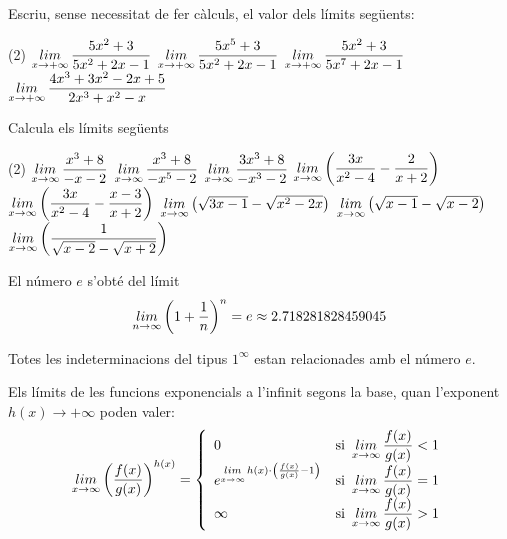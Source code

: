 \begin{mylist}
	\exer Escriu, sense necessitat de fer càlculs, el valor dels límits següents:

	\begin{tasks}(2) 
		\task  $\limx{+\infty} \dfrac{5x^2+3}{5x^2+2x-1}$
		\task  $\limx{+\infty} \dfrac{5x^5+3}{5x^2+2x-1}$
		\task  $\limx{+\infty} \dfrac{5x^2+3}{5x^7+2x-1}$
		\task  $\limx{+\infty} \dfrac{4x^3+3x^2-2x+5}{2x^3+x^2-x}$	
	\end{tasks}

	\answers{[$1$, $+\infty$, $0$, $2$]}
	
	\exer[1] Calcula els límits següents
	
	\begin{tasks}(2) 
		\task $\limx{\infty } \dfrac{x^{3} +8}{-x-2} $ 
		\task $\limx{\infty } \dfrac{x^{3} +8}{-x^{5} -2} $   
		\task $\limx{\infty } \dfrac{3x^{3} +8}{-x^{3} -2} $   
		\task $\limx{\infty } \left(\dfrac{3x}{x^{2} -4} -\dfrac{2}{x+2} \right)$
	\task $\limx{\infty } \left(\dfrac{3x}{x^{2} -4} -\dfrac{x-3}{x+2} \right)$  
	 \task $\limx{\infty } \left(\sqrt{3x-1} -\sqrt{x^{2} -2x} \right)$  
	 \task $\limx{\infty } \left(\sqrt{x-1} -\sqrt{x-2} \right)$ 
	 \task $\limx{\infty } \left(\dfrac{1}{\sqrt{x-2} -\sqrt{x+2} } \right)$
	\end{tasks}

\end{mylist}
\pagebreak

\begin{warningbox}
	
	El número $e$ s'obté del límit
	\[ \limx[n]{\infty} \left( 1+ \frac{1}{n} \right)^n = e \approx 2.718281828459045 \]
	
	Totes les indeterminacions del tipus $1^\infty$ estan relacionades amb el número $e$.
	
\end{warningbox}

\begin{theorybox}
	Els límits de les funcions exponencials a l'infinit segons la base, quan l'exponent $h(x) \rightarrow +\infty$ poden valer: 
	\begin{equation*}
	\limx{\infty} \left(\dfrac{f(x)}{g(x)}\right)^{h(x)} = \left\{ \begin{array}{ll} 0 & \mathrm{si}\,\, 	\limx{\infty} \dfrac{f(x)}{g(x)}<1 \\ e^{\limx{\infty} h(x)\cdot\left( \frac{f(x)}{g(x)} -1 \right)} & \mathrm{si}\,\, 	\limx{\infty} \dfrac{f(x)}{g(x)}=1  \\ \infty & \mathrm{si}\,\, 	\limx{\infty} \dfrac{f(x)}{g(x)}>1 \end{array} \right.
	\end{equation*}
\end{theorybox}

